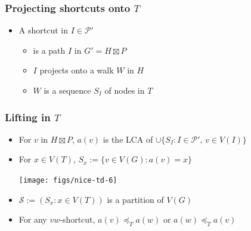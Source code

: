 \documentclass[xcolor=dvipsnames]{beamer}
\begin{document}
\begin{frame}
  \frametitle{Projecting shortcuts onto $T$}

  \begin{itemize}
    \item A shortcut in $I\in\mathcal{P'}$
    \begin{itemize}
      \item<2-> is a path $I$ in $G'=H\boxtimes P$
      \item<3-> $I$ projects onto a walk $W$ in $H$
      \item<4-> $W$ is a sequence $S_I$ of nodes in $T$
    \end{itemize}
  \end{itemize}
  \begin{center}
  \end{center}
\end{frame}

\begin{frame}
  \frametitle{Lifting in $T$}
  \begin{itemize}
    \item For $v$ in $H\boxtimes P$, $a(v)$ is the LCA of $\cup\{S_I:I\in\mathcal{P'},\, v\in V(I)\}$
    \item For $x\in V(T)$, $S_x:=\{v\in V(G): a(v)=x\}$
    \begin{center}
      \texttt{[image: figs/nice-td-6]}%
    \end{center}
    \item<2-> $\mathcal{S}:=(S_x:x\in V(T))$ is a partition of $V(G)$
    \item<3->[$(\star)$] For any $vw$-shortcut, $a(v)\preceq_T a(w)$ or $a(w)\preceq_T a(v)$
\end{itemize}
\end{frame}
\end{document}
